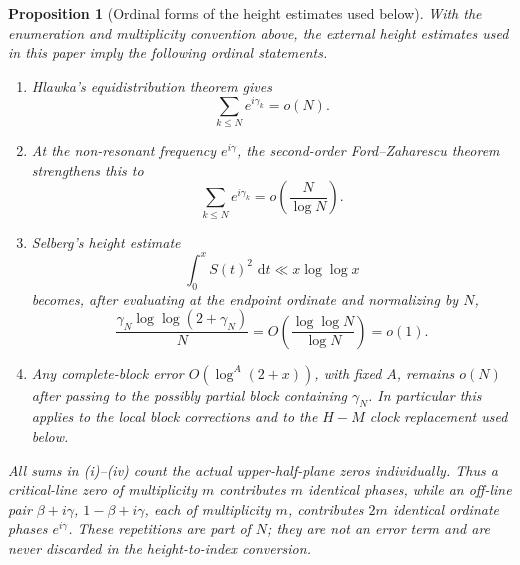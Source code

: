 \documentclass[11pt]{amsart}
\numberwithin{equation}{section}
\newtheorem{proposition}[theorem]{Proposition}
\theoremstyle{definition}
\theoremstyle{remark}
\newcommand{\dd}{\,\mathrm d}
\begin{document}
\begin{proposition}[Ordinal forms of the height estimates used below]\label{prop:ordinal_external_estimates}
With the enumeration and multiplicity convention above, the external height estimates used in this paper imply the following ordinal statements.
\begin{enumerate}[label=(\roman*)]
\item Hlawka's equidistribution theorem gives
\[
\sum_{k\le N}e^{i\gamma_k}=o(N).
\]
\item At the non-resonant frequency \(e^{i\gamma}\), the second-order Ford--Zaharescu theorem strengthens this to
\begin{equation}\label{eq:ordinal_FZ_rate}
\sum_{k\le N}e^{i\gamma_k}
=o\!\left(\frac{N}{\log N}\right).
\end{equation}
\item Selberg's height estimate
\[
\int_0^x S(t)^2\,\dd t\ll x\log\log x
\]
becomes, after evaluating at the endpoint ordinate and normalizing by \(N\),
\[
\frac{\gamma_N\log\log(2+\gamma_N)}{N}
=O\!\left(\frac{\log\log N}{\log N}\right)=o(1).
\]
\item Any complete-block error \(O(\log^A(2+x))\), with fixed \(A\), remains \(o(N)\) after passing to the possibly partial block containing \(\gamma_N\). In particular this applies to the local block corrections and to the \(H-M\) clock replacement used below.
\end{enumerate}
All sums in (i)--(iv) count the actual upper-half-plane zeros individually. Thus a critical-line zero of multiplicity \(m\) contributes \(m\) identical phases, while an off-line pair \(\beta+i\gamma\), \(1-\beta+i\gamma\), each of multiplicity \(m\), contributes \(2m\) identical ordinate phases \(e^{i\gamma}\). These repetitions are part of \(N\); they are not an error term and are never discarded in the height-to-index conversion.
\end{proposition}
\end{document}
